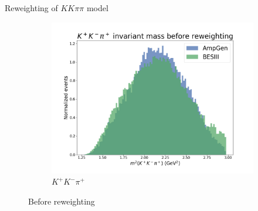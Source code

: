 \documentclass{beamer}
\begin{document}
\begin{frame}{Reweighting of \texorpdfstring{$KK\pi\pi$}{KKpipi} model}
\begin{figure}
\begin{subfigure}{0.33\textwidth}
      \includegraphics[width=\textwidth]{Plots/s012_BeforeReweighting.png}
      \caption{$K^+K^-\pi^+$}
    \end{subfigure}
    \caption{Before reweighting}
  \end{figure}
\end{frame}
\end{document}
